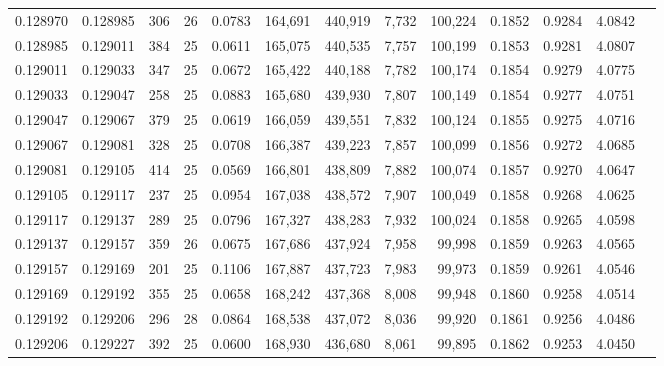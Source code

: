 \begin{tabular}{rrrrrrrrrrrrr}
0.128970 & 0.128985 &   306 &  26 &                                     0.0783 & 164,691 & 440,919 &   7,732 & 100,224 & 0.1852 & 0.9284 & 4.0842 \\
0.128985 & 0.129011 &   384 &  25 &                                     0.0611 & 165,075 & 440,535 &   7,757 & 100,199 & 0.1853 & 0.9281 & 4.0807 \\
0.129011 & 0.129033 &   347 &  25 &                                     0.0672 & 165,422 & 440,188 &   7,782 & 100,174 & 0.1854 & 0.9279 & 4.0775 \\
0.129033 & 0.129047 &   258 &  25 &                                     0.0883 & 165,680 & 439,930 &   7,807 & 100,149 & 0.1854 & 0.9277 & 4.0751 \\
0.129047 & 0.129067 &   379 &  25 &                                     0.0619 & 166,059 & 439,551 &   7,832 & 100,124 & 0.1855 & 0.9275 & 4.0716 \\
0.129067 & 0.129081 &   328 &  25 &                                     0.0708 & 166,387 & 439,223 &   7,857 & 100,099 & 0.1856 & 0.9272 & 4.0685 \\
0.129081 & 0.129105 &   414 &  25 &                                     0.0569 & 166,801 & 438,809 &   7,882 & 100,074 & 0.1857 & 0.9270 & 4.0647 \\
0.129105 & 0.129117 &   237 &  25 &                                     0.0954 & 167,038 & 438,572 &   7,907 & 100,049 & 0.1858 & 0.9268 & 4.0625 \\
0.129117 & 0.129137 &   289 &  25 &                                     0.0796 & 167,327 & 438,283 &   7,932 & 100,024 & 0.1858 & 0.9265 & 4.0598 \\
0.129137 & 0.129157 &   359 &  26 &                                     0.0675 & 167,686 & 437,924 &   7,958 &  99,998 & 0.1859 & 0.9263 & 4.0565 \\
0.129157 & 0.129169 &   201 &  25 &                                     0.1106 & 167,887 & 437,723 &   7,983 &  99,973 & 0.1859 & 0.9261 & 4.0546 \\
0.129169 & 0.129192 &   355 &  25 &                                     0.0658 & 168,242 & 437,368 &   8,008 &  99,948 & 0.1860 & 0.9258 & 4.0514 \\
0.129192 & 0.129206 &   296 &  28 &                                     0.0864 & 168,538 & 437,072 &   8,036 &  99,920 & 0.1861 & 0.9256 & 4.0486 \\
0.129206 & 0.129227 &   392 &  25 &                                     0.0600 & 168,930 & 436,680 &   8,061 &  99,895 & 0.1862 & 0.9253 & 4.0450 \\

\end{tabular}
